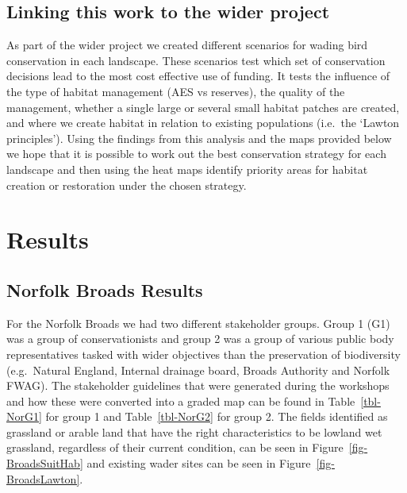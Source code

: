 \documentclass[
  12pt,
  letterpaper,
  DIV=11,
  numbers=noendperiod]{scrartcl}
\begin{document}
\subsection{Linking this work to the wider
project}\label{linking-this-work-to-the-wider-project}

As part of the wider project we created different scenarios for wading
bird conservation in each landscape. These scenarios test which set of
conservation decisions lead to the most cost effective use of funding.
It tests the influence of the type of habitat management (AES vs
reserves), the quality of the management, whether a single large or
several small habitat patches are created, and where we create habitat
in relation to existing populations (i.e.~the `Lawton principles').
Using the findings from this analysis and the maps provided below we
hope that it is possible to work out the best conservation strategy for
each landscape and then using the heat maps identify priority areas for
habitat creation or restoration under the chosen strategy.

\section{Results}\label{results}

\subsection{Norfolk Broads Results}\label{norfolk-broads-results}

For the Norfolk Broads we had two different stakeholder groups. Group 1
(G1) was a group of conservationists and group 2 was a group of various
public body representatives tasked with wider objectives than the
preservation of biodiversity (e.g.~Natural England, Internal drainage
board, Broads Authority and Norfolk FWAG). The stakeholder guidelines
that were generated during the workshops and how these were converted
into a graded map can be found in Table~\ref{tbl-NorG1} for group 1 and
Table~\ref{tbl-NorG2} for group 2. The fields identified as grassland or
arable land that have the right characteristics to be lowland wet
grassland, regardless of their current condition, can be seen in
Figure~\ref{fig-BroadsSuitHab} and existing wader sites can be seen in
Figure~\ref{fig-BroadsLawton}.
\end{document}

